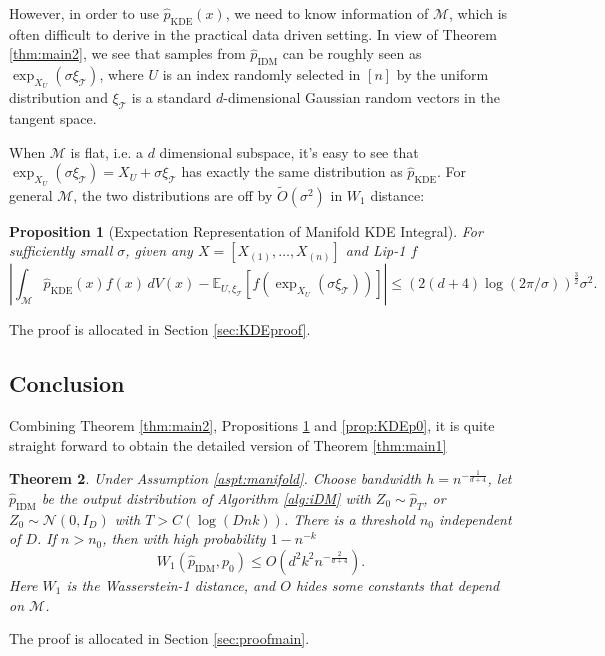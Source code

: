 \documentclass{article}
\newtheorem{theorem}{Theorem}[section]
\newtheorem{pro}[theorem]{Proposition}
\def\phat{\hat{p}}
\def\Otilde{\widetilde{O}}
\def\calM{\mathcal{M}}
\begin{document}
However, in order to use $\phat_{\text{KDE}}(x)$, we need to know information of $\calM$, which is often difficult to derive in the practical data driven setting. In view of Theorem \ref{thm:main2}, we see that samples from $\phat_{\text{IDM}}$ can be roughly seen as $\exp_{X_U}(\sigma \xi_{\mathcal{T}})$, where $U$ is an index  randomly selected in $[n]$ by the uniform distribution and $\xi_{\mathcal{T}}$ is a standard $d$-dimensional Gaussian random vectors in the tangent space. 

When $\calM$ is flat, i.e. a $d$ dimensional subspace, it's easy to see that $\exp_{X_U}(\sigma \xi_{\mathcal{T}})=X_U+\sigma \xi_{\mathcal{T}}$ has exactly the same distribution as $\phat_{\text{KDE}}$. For general $\calM$, the two distributions are off by $\Otilde(\sigma^2)$ in $W_1$ distance:




\begin{pro}[Expectation Representation of Manifold KDE Integral]
\label{pro:KDEexp}
For sufficiently small \( \sigma \), given any $X=[X_{(1)},\ldots, X_{(n)}]$ and Lip-1 $f$
\[
\left|\int_{\mathcal{M}} \hat{p}_{\mathrm{KDE}}(x) f(x) \, dV(x) - \mathbb{E}_{U, \xi_{\mathcal{T}}}[ f\left( \exp_{X_U}(\sigma \xi_{\mathcal{T}}) \right)] \right|\leq (2(d+4)\log (2\pi/\sigma))^{\frac{3}{2}}\sigma^2.
\]
\end{pro}
The proof is allocated in Section \ref{sec:KDEproof}.

\subsection{Conclusion }
Combining Theorem \ref{thm:main2}, Propositions \ref{pro:KDEexp} and \ref{prop:KDEp0}, it is quite straight forward  to obtain the detailed version of 
Theorem \ref{thm:main1}
\begin{theorem}
\label{thm:main3}
Under Assumption \ref{aspt:manifold}. Choose bandwidth $h=n^{-\frac{1}{d+4}}$, let $\phat_{\text{IDM}}$ be the output distribution of Algorithm \ref{alg:iDM} with $Z_0\sim \phat_T$, or $Z_0\sim \mathcal{N}(0,I_D)$ with $T>C(\log (Dnk))$. 
There is a threshold $n_0$ independent of $D$. If $n>n_0$,
then with high probability $1-n^{-k}$
\[
W_1(\phat_{\text{IDM}},p_0)\leq O( d^2 k^2 n^{-\frac{2}{d+4}}). 
\]    
Here $W_1$ is the Wasserstein-1 distance, and $O$ hides some constants that depend on $\calM$. 
\end{theorem}
The proof is allocated in Section \ref{sec:proofmain}.


\def\CZeroValue{0.8}
\def\CZeroValueSecond{0.8}
\def\EmpiricalIDMRate{-0.201}
\def\EmpiricalMemorizedDMRate{-0.168}
\end{document}
